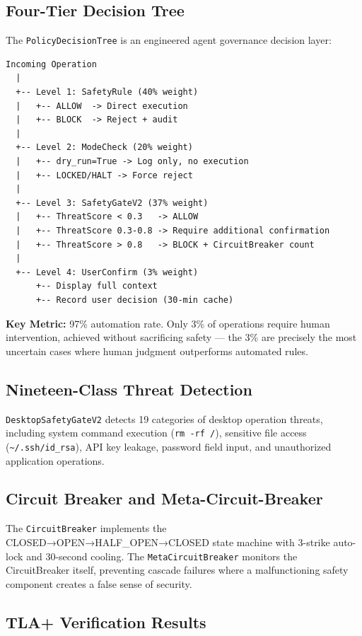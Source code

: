 \documentclass[11pt,a4paper]{article}
\begin{document}
\subsection{Four-Tier Decision Tree}

The \texttt{PolicyDecisionTree} is an engineered agent governance decision layer:

\begin{verbatim}
Incoming Operation
  |
  +-- Level 1: SafetyRule (40% weight)
  |   +-- ALLOW  -> Direct execution
  |   +-- BLOCK  -> Reject + audit
  |
  +-- Level 2: ModeCheck (20% weight)
  |   +-- dry_run=True -> Log only, no execution
  |   +-- LOCKED/HALT -> Force reject
  |
  +-- Level 3: SafetyGateV2 (37% weight)
  |   +-- ThreatScore < 0.3   -> ALLOW
  |   +-- ThreatScore 0.3-0.8 -> Require additional confirmation
  |   +-- ThreatScore > 0.8   -> BLOCK + CircuitBreaker count
  |
  +-- Level 4: UserConfirm (3% weight)
      +-- Display full context
      +-- Record user decision (30-min cache)
\end{verbatim}

\noindent\textbf{Key Metric:} 97\% automation rate. Only 3\% of operations require human intervention, achieved without sacrificing safety --- the 3\% are precisely the most uncertain cases where human judgment outperforms automated rules.

\subsection{Nineteen-Class Threat Detection}

\texttt{DesktopSafetyGateV2} detects 19 categories of desktop operation threats, including system command execution (\texttt{rm -rf /}), sensitive file access (\texttt{\textasciitilde/.ssh/id\_rsa}), API key leakage, password field input, and unauthorized application operations.

\subsection{Circuit Breaker and Meta-Circuit-Breaker}

The \texttt{CircuitBreaker} implements the CLOSED→OPEN→HALF\_OPEN→CLOSED state machine with 3-strike auto-lock and 30-second cooling. The \texttt{MetaCircuitBreaker} monitors the CircuitBreaker itself, preventing cascade failures where a malfunctioning safety component creates a false sense of security.

\subsection{TLA+ Verification Results}
\end{document}
